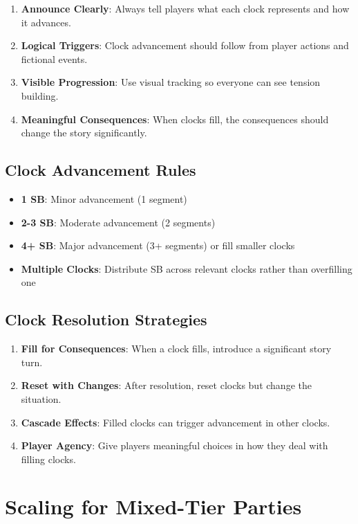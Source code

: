 \begin{enumerate}
\item \textbf{Announce Clearly}: Always tell players what each clock represents and how it advances.
\item \textbf{Logical Triggers}: Clock advancement should follow from player actions and fictional events.
\item \textbf{Visible Progression}: Use visual tracking so everyone can see tension building.
\item \textbf{Meaningful Consequences}: When clocks fill, the consequences should change the story significantly.
\end{enumerate}

\subsection*{Clock Advancement Rules}

\begin{itemize}
\item \textbf{1 SB}: Minor advancement (1 segment)
\item \textbf{2-3 SB}: Moderate advancement (2 segments)  
\item \textbf{4+ SB}: Major advancement (3+ segments) or fill smaller clocks
\item \textbf{Multiple Clocks}: Distribute SB across relevant clocks rather than overfilling one
\end{itemize}

\subsection*{Clock Resolution Strategies}

\begin{enumerate}
\item \textbf{Fill for Consequences}: When a clock fills, introduce a significant story turn.
\item \textbf{Reset with Changes}: After resolution, reset clocks but change the situation.
\item \textbf{Cascade Effects}: Filled clocks can trigger advancement in other clocks.
\item \textbf{Player Agency}: Give players meaningful choices in how they deal with filling clocks.
\end{enumerate}

\section*{Scaling for Mixed-Tier Parties}

